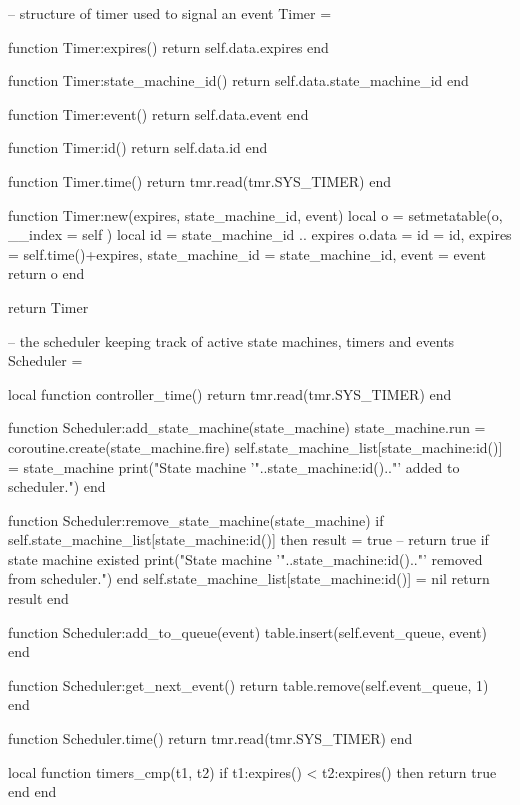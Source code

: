 \begin{appendices}
\begin{listing}[htp]
\begin{luacode}
-- structure of timer used to signal an event
Timer = {}

function Timer:expires()
	return self.data.expires
end

function Timer:state_machine_id()
	return self.data.state_machine_id
end

function Timer:event()
	return self.data.event
end

function Timer:id()
	return self.data.id
end

function Timer.time()
	return tmr.read(tmr.SYS_TIMER)
end

function Timer:new(expires, state_machine_id, event)
	local o = {}
	setmetatable(o, { __index = self })
	local id = state_machine_id .. expires
	o.data = {id = id, expires = self.time()+expires,
						state_machine_id = state_machine_id, event = event}
	return o
end

return Timer
\end{luacode}
\end{listing}

\begin{listing}[htp]
\begin{luacode}
-- the scheduler keeping track of active state machines, timers and events
Scheduler = {}

local function controller_time()
  return tmr.read(tmr.SYS_TIMER)
end

function Scheduler:add_state_machine(state_machine)
  state_machine.run = coroutine.create(state_machine.fire)
  self.state_machine_list[state_machine:id()] = state_machine
  print("State machine '"..state_machine:id().."' added to scheduler.")
end

function Scheduler:remove_state_machine(state_machine)
  if self.state_machine_list[state_machine:id()] then
    result = true -- return true if state machine existed
    print("State machine '"..state_machine:id().."' removed from scheduler.")
  end
    self.state_machine_list[state_machine:id()] = nil
  return result
end

function Scheduler:add_to_queue(event)
  table.insert(self.event_queue, event)
end

function Scheduler:get_next_event()
  return table.remove(self.event_queue, 1)
end

function Scheduler.time()
  return tmr.read(tmr.SYS_TIMER)
end

local function timers_cmp(t1, t2)
  if t1:expires() < t2:expires() then return true end
end


\end{luacode}
\end{listing}
\end{appendices}
